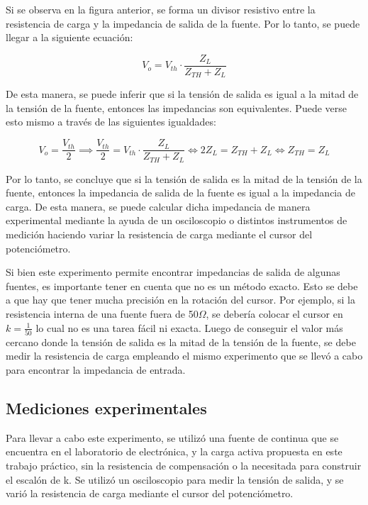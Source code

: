 \documentclass[12pt,oneside,a4paper]{article}
\begin{document}
Si se observa en la figura anterior, se forma un divisor resistivo entre la resistencia de carga y la 
impedancia de salida de la fuente. Por lo tanto, se puede llegar a la siguiente ecuación:

\begin{equation}
    V_o = V_{th} \cdot \frac{Z_{L}}{Z_{TH} + Z_L}
\end{equation}

De esta manera, se puede inferir que si la tensión de salida es igual a la mitad de la tensión de la fuente,
entonces las impedancias son equivalentes. Puede verse esto mismo a través de las siguientes igualdades:

\begin{equation}
    V_o = \frac{V_{th}}{2} \implies \frac{V_{th}}{2} = V_{th} \cdot \frac{Z_{L}}{Z_{TH} + Z_L} 
    \iff 2Z_{L} = Z_{TH} + Z_L \iff Z_{TH} = Z_L
\end{equation}

Por lo tanto, se concluye que si la tensión de salida es la mitad de la tensión de la fuente, entonces
la impedancia de salida de la fuente es igual a la impedancia de carga. De esta manera, se puede calcular 
dicha impedancia de manera experimental mediante la ayuda de un osciloscopio o distintos 
instrumentos de medición haciendo variar la resistencia de carga mediante el cursor del potenciómetro.

Si bien este experimento permite encontrar impedancias de salida de algunas fuentes, es importante 
tener en cuenta que no es un método exacto. Esto se debe a que hay que tener mucha precisión en la 
rotación del cursor. Por ejemplo, si la resistencia interna de una fuente fuera de 50$\Omega$, se 
debería colocar el cursor en $k = \frac{1}{50}$ lo cual no es una tarea fácil ni exacta. Luego 
de conseguir el valor más cercano donde la tensión de salida es la mitad de la tensión de la fuente, 
se debe medir la resistencia de carga empleando el mismo experimento que se
llevó a cabo para encontrar la impedancia de entrada.

\subsection{Mediciones experimentales}

Para llevar a cabo este experimento, se utilizó una fuente de continua que se encuentra en el 
laboratorio de electrónica, y la carga activa propuesta en este trabajo práctico, sin la resistencia
de compensación o la necesitada para construir el escalón de k. Se utilizó un osciloscopio para 
medir la tensión de salida, y se varió la resistencia de carga mediante el cursor del potenciómetro.
\end{document}
